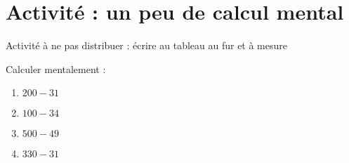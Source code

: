 
\section{Activité : un peu de calcul mental}
Activité à ne pas distribuer : écrire au tableau au fur et à mesure

Calculer mentalement :
\begin{enumerate}
    \item
        \( 200-31\)
    \item
        \( 100-34\)
    \item
        \( 500-49\)
    \item
        \( 330-31\)
\end{enumerate}
